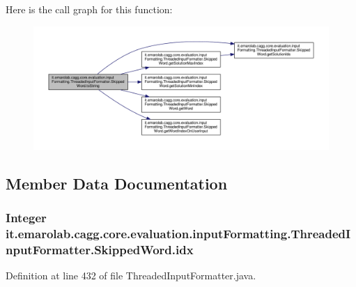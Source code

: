 Here is the call graph for this function\-:\nopagebreak
\begin{figure}[H]
\begin{center}
\leavevmode
\includegraphics[width=350pt]{classit_1_1emarolab_1_1cagg_1_1core_1_1evaluation_1_1inputFormatting_1_1ThreadedInputFormatter_1_1SkippedWord_aa0c6fb69a5165d2236ea73f679a2736e_cgraph}
\end{center}
\end{figure}




\subsection{Member Data Documentation}
\hypertarget{classit_1_1emarolab_1_1cagg_1_1core_1_1evaluation_1_1inputFormatting_1_1ThreadedInputFormatter_1_1SkippedWord_ad4267b6003f5263502e4b955885f7482}{
\subsubsection[{idx}]{\setlength{\rightskip}{0pt plus 5cm}Integer it.\-emarolab.\-cagg.\-core.\-evaluation.\-input\-Formatting.\-Threaded\-Input\-Formatter.\-Skipped\-Word.\-idx\hspace{0.3cm}{\ttfamily [private]}}}\label{classit_1_1emarolab_1_1cagg_1_1core_1_1evaluation_1_1inputFormatting_1_1ThreadedInputFormatter_1_1SkippedWord_ad4267b6003f5263502e4b955885f7482}


Definition at line 432 of file Threaded\-Input\-Formatter.\-java.



